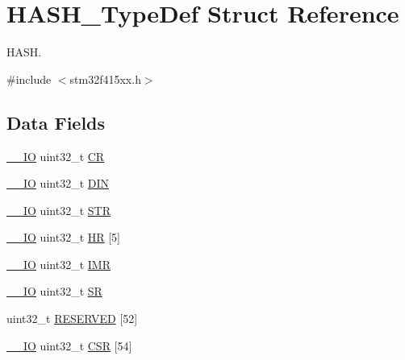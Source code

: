 \hypertarget{struct_h_a_s_h___type_def}{}\section{H\+A\+S\+H\+\_\+\+Type\+Def Struct Reference}
\label{struct_h_a_s_h___type_def}


H\+A\+SH.  




{\ttfamily \#include $<$stm32f415xx.\+h$>$}

\subsection*{Data Fields}
\begin{DoxyCompactItemize}
\item 
\hyperlink{core__sc300_8h_aec43007d9998a0a0e01faede4133d6be}{\+\_\+\+\_\+\+IO} uint32\+\_\+t \hyperlink{struct_h_a_s_h___type_def_ab40c89c59391aaa9d9a8ec011dd0907a}{CR}
\item 
\hyperlink{core__sc300_8h_aec43007d9998a0a0e01faede4133d6be}{\+\_\+\+\_\+\+IO} uint32\+\_\+t \hyperlink{struct_h_a_s_h___type_def_a445dd5529e7dc6a4fa2fec4f78da2692}{D\+IN}
\item 
\hyperlink{core__sc300_8h_aec43007d9998a0a0e01faede4133d6be}{\+\_\+\+\_\+\+IO} uint32\+\_\+t \hyperlink{struct_h_a_s_h___type_def_a7060ac1ed928ee931d7664650f2dcf75}{S\+TR}
\item 
\hyperlink{core__sc300_8h_aec43007d9998a0a0e01faede4133d6be}{\+\_\+\+\_\+\+IO} uint32\+\_\+t \hyperlink{struct_h_a_s_h___type_def_aa218f0052087d560f8a12bcb5e14310a}{HR} \mbox{[}5\mbox{]}
\item 
\hyperlink{core__sc300_8h_aec43007d9998a0a0e01faede4133d6be}{\+\_\+\+\_\+\+IO} uint32\+\_\+t \hyperlink{struct_h_a_s_h___type_def_ae845b86e973b4bf8a33c447c261633f6}{I\+MR}
\item 
\hyperlink{core__sc300_8h_aec43007d9998a0a0e01faede4133d6be}{\+\_\+\+\_\+\+IO} uint32\+\_\+t \hyperlink{struct_h_a_s_h___type_def_af6aca2bbd40c0fb6df7c3aebe224a360}{SR}
\item 
uint32\+\_\+t \hyperlink{struct_h_a_s_h___type_def_a71a069697b12674f9ad8311d47326fc9}{R\+E\+S\+E\+R\+V\+ED} \mbox{[}52\mbox{]}
\item 
\hyperlink{core__sc300_8h_aec43007d9998a0a0e01faede4133d6be}{\+\_\+\+\_\+\+IO} uint32\+\_\+t \hyperlink{struct_h_a_s_h___type_def_aff58fd9be043a6ce455a6829d2725007}{C\+SR} \mbox{[}54\mbox{]}
\end{DoxyCompactItemize}


